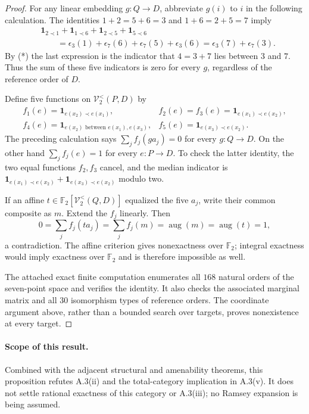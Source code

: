 \begin{proof}
For any linear embedding $g:Q\to D$, abbreviate $g(i)$ to $i$ in
the following calculation. The identities
$1+2=5+6=3$ and $1+6=2+5=7$ imply
\[
\begin{split}
 &\mathbf1_{2\prec1}+\mathbf1_{1\prec6}
       +\mathbf1_{2\prec5}+\mathbf1_{5\prec6}\\
 &\qquad=\epsilon_3(1)+\epsilon_7(6)
       +\epsilon_7(5)+\epsilon_3(6)
  =\epsilon_3(7)+\epsilon_7(3).
\end{split}
\]
By (*) the last expression is the indicator that $4=3+7$ lies
between $3$ and $7$. Thus the sum of these five indicators is zero
for every $g$, regardless of the reference order of $D$.

Define five functions on $\mathcal V^{<}_2(P,D)$ by
\[
\begin{array}{ll}
 f_1(e)=\mathbf1_{e(x_2)\prec e(x_1)},&
 f_2(e)=f_3(e)=\mathbf1_{e(x_1)\prec e(x_2)},\\
 f_4(e)=\mathbf1_{e(x_2)\text{ between }e(x_1),e(x_3)},&
 f_5(e)=\mathbf1_{e(x_3)\prec e(x_2)}.
\end{array}
\]
The preceding calculation says $\sum_j f_j(ga_j)=0$ for every
$g:Q\to D$. On the other hand $\sum_j f_j(e)=1$ for every
$e:P\to D$. To check the latter identity, the two equal functions
$f_2,f_3$ cancel, and the median indicator is
$\mathbf1_{e(x_1)\prec e(x_2)}+
\mathbf1_{e(x_3)\prec e(x_2)}$ modulo two.

If an affine $t\in\mathbb F_2[\mathcal V^{<}_2(Q,D)]$ equalized
the five $a_j$, write their common composite as $m$. Extend the
$f_j$ linearly. Then
\[
 0=\sum_j f_j(ta_j)=\sum_j f_j(m)
    =\operatorname{aug}(m)=\operatorname{aug}(t)=1,
\]
a contradiction. The affine criterion gives nonexactness over
$\mathbb F_2$; integral exactness would imply exactness over
$\mathbb F_2$ and is therefore impossible as well.

The attached exact finite computation enumerates all $168$ natural
orders of the seven-point space and verifies the identity. It also
checks the associated marginal matrix and all $30$ isomorphism types
of reference orders. The coordinate argument above, rather than a
bounded search over targets, proves nonexistence at every target.
\end{proof}

\paragraph{Scope of this result.}
Combined with the adjacent structural and amenability theorems, this
proposition refutes A.3(ii) and the total-category implication in
A.3(v). It does not settle rational exactness of this category or
A.3(iii); no Ramsey expansion is being assumed.
